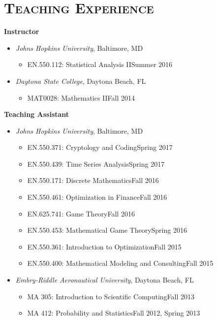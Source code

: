\documentclass[10pt]{article}
\begin{document}
\section*{\textsc{Teaching Experience}}
\textbf{Instructor}
\begin{itemize}[noitemsep]
	\item[] \textit{Johns Hopkins University}, Baltimore, MD
	\begin{itemize}[noitemsep]
		\item EN.550.112: Statistical Analysis II\hfill Summer 2016
	\end{itemize}
	\vspace{2ex}
	\item[] \textit{Daytona State College}, Daytona Beach, FL
    \begin{itemize}[noitemsep]
        \item MAT0028: Mathematics II\hfill Fall 2014
    \end{itemize}
\end{itemize}
\textbf{Teaching Assistant}
\begin{itemize}[noitemsep]
    \item[] \textit{Johns Hopkins University}, Baltimore, MD
    \begin{itemize}[noitemsep]
    	\item EN.550.371: Cryptology and Coding\hfill Spring 2017
    	\item EN.550.439: Time Series Analysis\hfill Spring 2017
		\item EN.550.171: Discrete Mathematics\hfill Fall 2016    	
    	\item EN.550.461: Optimization in Finance\hfill Fall 2016
		\item EN.625.741: Game Theory\hfill Fall 2016
		\item EN.550.453: Mathematical Game Theory\hfill Spring 2016
		\item EN.550.361: Introduction to Optimization\hfill Fall 2015
		\item EN.550.400: Mathematical Modeling and Consulting\hfill Fall 2015
    \end{itemize}
    \vspace{2ex}
    \item[] \textit{Embry-Riddle Aeronautical University}, Daytona Beach, FL
    \begin{itemize}[noitemsep]
        \item MA 305: Introduction to Scientific Computing\hfill Fall 2013
        \item MA 412: Probability and Statistics\hfill Fall 2012, Spring 2013
    \end{itemize}
\end{itemize}
\end{document}
